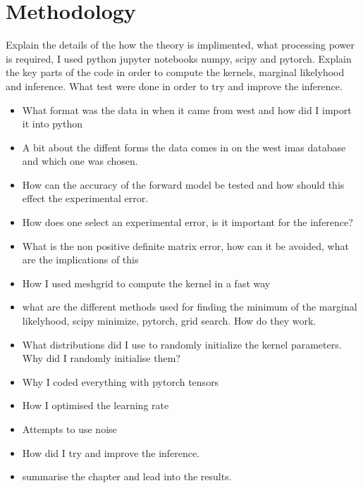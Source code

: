 \chapter{Methodology}

Explain the details of the how the theory is implimented, what processing power is required, I used python jupyter notebooks numpy, scipy and pytorch. Explain the key parts of the code in order to compute the kernels, marginal likelyhood and inference. What test were done in order to try and improve the inference. 

\begin{itemize}
    \item What format was the data in when it came from west and how did I import it into python
    \item A bit about the diffent forms the data comes in on the west imas database and which one was chosen. 
    \item How can the accuracy of the forward model be tested and how should this effect the experimental error.
    \item How does one select an experimental error, is it important for the inference? 
    \item What is the non positive definite matrix error, how can it be avoided, what are the implications of this
    \item How I used meshgrid to compute the kernel in a fast way
    \item what are the different methods used for finding the minimum of the marginal likelyhood, scipy minimize, pytorch, grid search. How do they work. 
    \item What distributions did I use to randomly initialize the kernel parameters. Why did I randomly initialise them?
    \item Why I coded everything with pytorch tensors
    \item How I optimised the learning rate
    \item Attempts to use noise
    \item How did I try and improve the inference.
    \item summarise the chapter and lead into the results. 
    
\end{itemize}